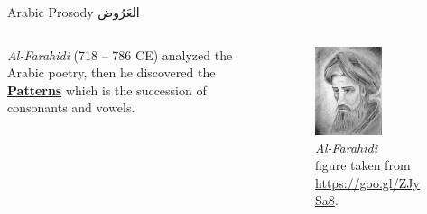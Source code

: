 \begin{frame}[fragile]{Arabic Prosody \textarabic{العَرُوض}}
\begin{columns}
\begin{column}{0.4\textwidth}
	\textit{Al-Farahidi} (718 – 786 CE) analyzed the Arabic poetry, then he discovered the \alert{\underline{\textbf{Patterns}}} which is the succession of consonants and vowels.
\end{column}
\begin{column}{0.4\textwidth}
		\begin{figure}
			\begin{center}
				\includegraphics[width=0.6\textwidth]{Figures/Al-Farahidi.jpg}
				\caption{\textit{Al-Farahidi}\\
{\tiny figure taken from \url{https://goo.gl/ZJySa8}}.}
			\end{center}
		\end{figure}
\end{column}
\end{columns}
\end{frame}

